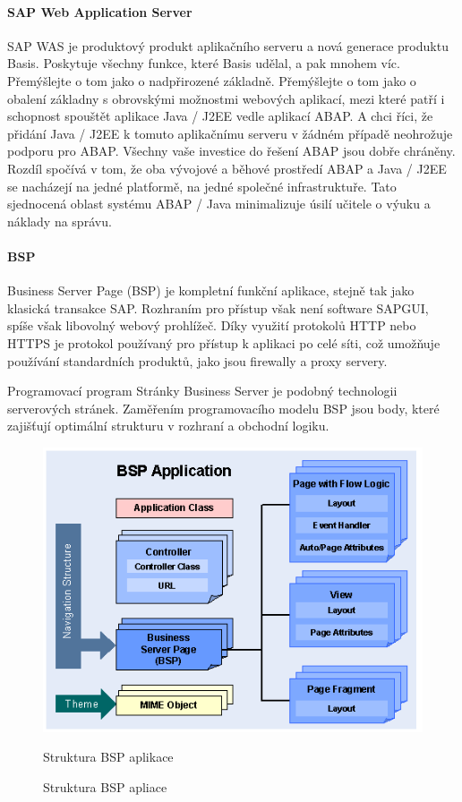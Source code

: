 \documentclass[thesis=M,czech]{FITthesis}[2012/06/26]
\begin{document}
\paragraph{SAP Web Application Server} SAP WAS je produktový produkt aplikačního serveru a nová generace produktu Basis. Poskytuje všechny funkce, které Basis udělal, a pak mnohem víc. Přemýšlejte o tom jako o nadpřirozené základně. Přemýšlejte o tom jako o obalení základny s obrovskými možnostmi webových aplikací, mezi které patří i schopnost spouštět aplikace Java / J2EE vedle aplikací ABAP. A chci říci, že přidání Java / J2EE k tomuto aplikačnímu serveru v žádném případě neohrožuje podporu pro ABAP. Všechny vaše investice do řešení ABAP jsou dobře chráněny. Rozdíl spočívá v tom, že oba vývojové a běhové prostředí ABAP a Java / J2EE se nacházejí na jedné platformě, na jedné společné infrastruktuře. Tato sjednocená oblast systému ABAP / Java minimalizuje úsilí učitele o výuku a náklady na správu.

\paragraph{BSP} Business Server Page (BSP) je kompletní funkční aplikace, stejně tak jako klasická transakce SAP. Rozhraním pro přístup však není software SAPGUI, spíše však libovolný webový prohlížeč. Díky využití protokolů HTTP nebo HTTPS je protokol používaný pro přístup k aplikaci po celé síti, což umožňuje používání standardních produktů, jako jsou firewally a proxy servery.

Programovací program Stránky Business Server je podobný technologii serverových stránek. Zaměřením programovacího modelu BSP jsou body, které zajišťují optimální strukturu v rozhraní a obchodní logiku.

\begin{figure}[H]
	\centering
	\includegraphics[width=1\textwidth]{images/bsp.png}
	\caption{Struktura BSP apliace}
	\label{img:bsp}
	\small
	Struktura BSP aplikace
\end{figure}
\end{document}
